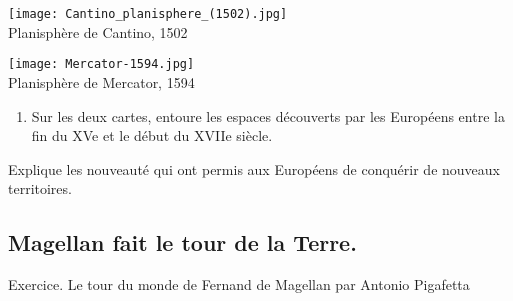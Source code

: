 \documentclass{beamer}
\begin{document}

\begin{frame}

\texttt{[image: Cantino\_planisphere\_(1502).jpg]}\\
Planisphère de Cantino, 1502
\end{frame}


\begin{frame}
\texttt{[image: Mercator-1594.jpg]} \\
Planisphère de Mercator, 1594
\end{frame}

\begin{frame}
\begin{enumerate}
 \item Sur les deux cartes, entoure les espaces découverts par les Européens entre la fin du XVe et le début du XVIIe siècle.
\end{enumerate}
\end{frame}

\begin{frame}
Explique les nouveauté qui ont permis aux Européens de conquérir de nouveaux territoires.
\end{frame}

\subsection{Magellan fait le tour de la Terre.}

\begin{frame}{Exercice. Le tour du monde de Fernand de Magellan par Antonio Pigafetta}
\end{frame}
\end{document}
